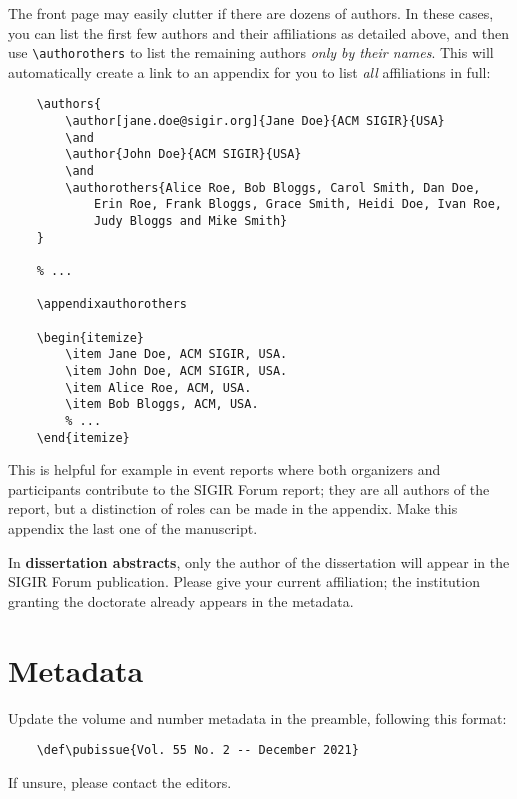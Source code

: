 \documentclass[news]{sigirforum}
\def\pubissue{v{{SIGIRFORUMVERSION}} -- {{SIGIRFORUMDATE}}}
\begin{document}
The front page may easily clutter if there are dozens of authors. In these cases, you can list the first few authors and their affiliations as detailed above, and then use \texttt{\textbackslash authorothers} to list the remaining authors \textsl{only by their names}. This will automatically create a link to an appendix for you to list \textsl{all} affiliations in full:
\begin{verbatim}
    \authors{
        \author[jane.doe@sigir.org]{Jane Doe}{ACM SIGIR}{USA}
        \and
        \author{John Doe}{ACM SIGIR}{USA}
        \and
        \authorothers{Alice Roe, Bob Bloggs, Carol Smith, Dan Doe,
            Erin Roe, Frank Bloggs, Grace Smith, Heidi Doe, Ivan Roe,
            Judy Bloggs and Mike Smith}
    }
    
    % ...
    
    \appendixauthorothers
    
    \begin{itemize}
        \item Jane Doe, ACM SIGIR, USA.
        \item John Doe, ACM SIGIR, USA.
        \item Alice Roe, ACM, USA.
        \item Bob Bloggs, ACM, USA.
        % ...
    \end{itemize}
\end{verbatim}
This is helpful for example in event reports where both organizers and participants contribute to the SIGIR Forum report; they are all authors of the report, but a distinction of roles can be made in the appendix. Make this appendix the last one of the manuscript.

In \textbf{dissertation abstracts}, only the author of the dissertation will appear in the SIGIR Forum publication. Please give your current affiliation; the institution granting the doctorate already appears in the metadata.

\section{Metadata}

Update the volume and number metadata in the preamble, following this format:
\begin{verbatim}
    \def\pubissue{Vol. 55 No. 2 -- December 2021}
\end{verbatim}
If unsure, please contact the editors.
\end{document}
